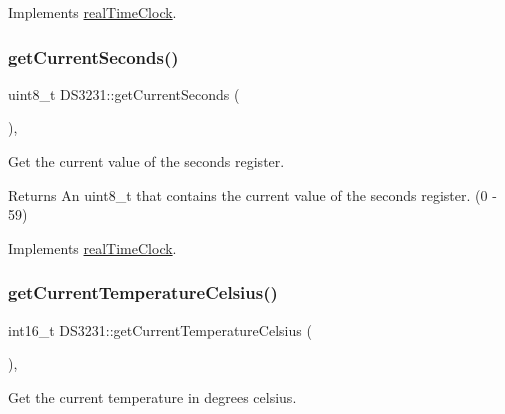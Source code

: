 Implements \mbox{\hyperlink{classreal_time_clock_a24dd15babb345129fd995641946c5f2b}{real\+Time\+Clock}}.

\mbox{\label{class_d_s3231_a8a5357eae07991d94f8f7610a3f3073a}} 
\subsubsection{\texorpdfstring{get\+Current\+Seconds()}{getCurrentSeconds()}}
{\footnotesize\ttfamily uint8\+\_\+t D\+S3231\+::get\+Current\+Seconds (\begin{DoxyParamCaption}{ }\end{DoxyParamCaption})\hspace{0.3cm}{\ttfamily [override]}, {\ttfamily [virtual]}}



Get the current value of the seconds register. 

\begin{DoxyReturn}{Returns}
An uint8\+\_\+t that contains the current value of the seconds register. (0 -\/ 59) 
\end{DoxyReturn}


Implements \mbox{\hyperlink{classreal_time_clock_a46bfe69dc650cc27e648ac7adb03afd0}{real\+Time\+Clock}}.

\mbox{\label{class_d_s3231_abd46c1cf5f5c78e3222c3677e70a1272}} 
\subsubsection{\texorpdfstring{get\+Current\+Temperature\+Celsius()}{getCurrentTemperatureCelsius()}}
{\footnotesize\ttfamily int16\+\_\+t D\+S3231\+::get\+Current\+Temperature\+Celsius (\begin{DoxyParamCaption}{ }\end{DoxyParamCaption})\hspace{0.3cm}{\ttfamily [override]}, {\ttfamily [virtual]}}



Get the current temperature in degrees celsius. 

